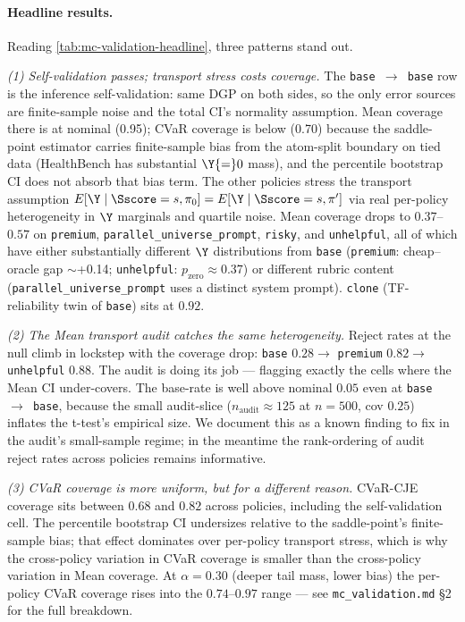 \paragraph{Headline results.}


Reading \cref{tab:mc-validation-headline}, three patterns stand out.

\textit{(1) Self-validation passes; transport stress costs coverage.} The
\texttt{base $\to$ base} row is the inference self-validation: same DGP on
both sides, so the only error sources are finite-sample noise and the
total CI's normality assumption. Mean coverage there is at nominal (0.95);
CVaR coverage is below (0.70) because the saddle-point estimator carries
finite-sample bias from the atom-split boundary on tied data (HealthBench
has substantial $\Y{=}0$ mass), and the percentile bootstrap CI does not
absorb that bias term. The other policies stress the transport assumption
$E[\Y \mid \Sscore=s, \pi_0] = E[\Y \mid \Sscore=s, \pi']$ via real
per-policy heterogeneity in $\Y$ marginals and quartile noise. Mean
coverage drops to $0.37$--$0.57$ on \texttt{premium},
\texttt{parallel\_universe\_prompt}, \texttt{risky}, and
\texttt{unhelpful}, all of which have either substantially different $\Y$
distributions from \texttt{base} (\texttt{premium}: cheap--oracle gap
$\sim$+0.14; \texttt{unhelpful}: $p_{\text{zero}} \approx 0.37$) or
different rubric content (\texttt{parallel\_universe\_prompt} uses a
distinct system prompt). \texttt{clone} (TF-reliability twin of
\texttt{base}) sits at $0.92$.

\textit{(2) The Mean transport audit catches the same heterogeneity.}
Reject rates at the null climb in lockstep with the coverage drop:
\texttt{base} $0.28 \to$ \texttt{premium} $0.82 \to$ \texttt{unhelpful}
$0.88$. The audit is doing its job — flagging exactly the cells where the
Mean CI under-covers. The base-rate is well above nominal $0.05$ even at
\texttt{base $\to$ base}, because the small audit-slice ($n_{\text{audit}}
\approx 125$ at $n{=}500$, cov $0.25$) inflates the t-test's empirical
size. We document this as a known finding to fix in the audit's
small-sample regime; in the meantime the rank-ordering of audit reject
rates across policies remains informative.

\textit{(3) CVaR coverage is more uniform, but for a different reason.}
CVaR-CJE coverage sits between $0.68$ and $0.82$ across policies,
including the self-validation cell. The percentile bootstrap CI undersizes
relative to the saddle-point's finite-sample bias; that effect dominates
over per-policy transport stress, which is why the cross-policy variation
in CVaR coverage is smaller than the cross-policy variation in Mean
coverage. At $\alpha{=}0.30$ (deeper tail mass, lower bias) the per-policy
CVaR coverage rises into the $0.74$--$0.97$ range — see
\texttt{mc\_validation.md} \S 2 for the full breakdown.

